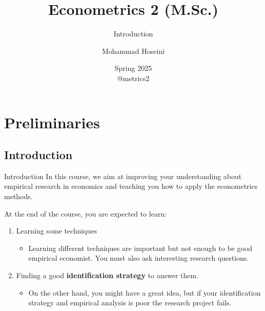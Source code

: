 \documentclass[handout]{beamer}
\begin{document}
	\title[Econometrics 2]{Econometrics 2 (M.Sc.)}
	\subtitle{Introduction}
	\author[Mohammad Hoseini]{Mohammad Hoseini}
	
	
	\date[Spring 2025]{Spring 2025 \\
		 \vspace{10pt} @metrics2
	}
	
\begin{frame}[plain]
	\titlepage
\end{frame}

\section{Preliminaries }
\subsection{Introduction}

\begin{frame}{Introduction}
In this course, we aim at improving your understanding about empirical research in economics and teaching you how to apply the econometrics methods. \medskip


At the end of the course, you are expected to learn:

\begin{enumerate}
	\item Learning some techniques
	\begin{itemize}
		\item Learning different techniques are important but not enough to be good empirical economist. You must also ask interesting research questions.
	\end{itemize}	
	
	\item Finding a good \textbf{identification strategy} to answer them.
	\begin{itemize}
	\item On the other hand, you might have a great idea, but if your identification strategy and empirical analysis is poor the research project fails.
	\end{itemize}

\end{enumerate}

\end{frame}
\end{document}
